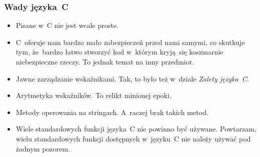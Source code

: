 \documentclass[10pt,t]{beamer}
\begin{document}
\begin{frame}
  \frametitle{Wady języka~C}


  \begin{itemize}

  \item Pisane w~C nie jest wcale proste.

  \item C~oferuje nam bardzo mało zabezpieczeń przed nami samymi, co
    skutkuje tym, że~bardzo łatwo stworzyć kod w~którym kryją~się
    koszmarnie niebezpieczne rzeczy. To jednak temat na inny przedmiot.

  \item Jawne zarządzanie wskaźnikami. Tak, to było też w~dziale
    \textit{Zalety języka~C}.

  \item Arytmetyka wskaźników. To relikt minionej epoki.

  \item Metody operowania na stringach. A~raczej brak takich metod.

  \item Wiele standardowych funkcji języka~C \alert{nie} powinno być
    używane. Powtarzam, wielu standardowych funkcji dostępnych w~języku~C
    \alert{nie należy} używać pod żadnym pozorem.

  \end{itemize}

\end{frame}
\end{document}
